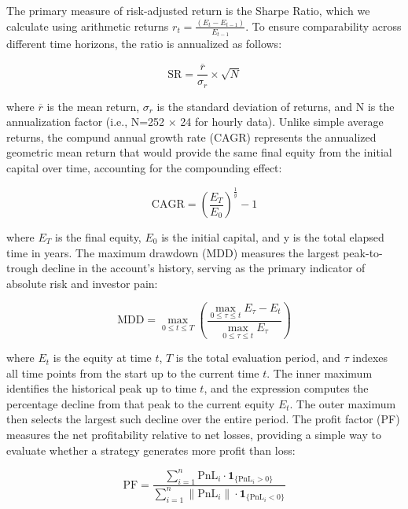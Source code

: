 \documentclass[12pt, a4paper]{article}
\begin{document}
The primary measure of risk-adjusted return is the Sharpe Ratio, which we calculate using arithmetic returns \( r_t = \frac{(E_t - E_{t-1})}{E_{t-1}} \). 
To ensure comparability across different time horizons, the ratio is annualized as follows:

\begin{equation}
    \text{SR} = \frac{\overline{r}}{\sigma_{r}} \times \sqrt{N}
    \label{eq:sharpe_ratio}
\end{equation}

where $\overline{r}$ is the mean return, $\sigma_{r}$ is the standard deviation of returns, and N is the annualization factor (i.e., N=252 $\times$ 24 for hourly data).
Unlike simple average returns, the compund annual growth rate (CAGR) represents the annualized geometric mean return that would provide the same final equity from the initial capital over time, 
accounting for the compounding effect:

\begin{equation}
    \text{CAGR} = \left( \frac{E_T}{E_0} \right)^{\frac{1}{y}} - 1
    \label{eq:cagr}
\end{equation}

where $E_T$ is the final equity, $E_0$ is the initial capital, and y is the total elapsed time in years.
The maximum drawdown (MDD) measures the largest peak-to-trough decline in the account's history, serving as the primary indicator of absolute risk and investor pain:

\begin{equation}
    \text{MDD} = \max_{0 \leq t \leq T} \left( \frac{ \max_{0 \leq \tau \leq t} E_\tau - E_t }{ \max_{0 \leq \tau \leq t} E_\tau } \right)
    \label{eq:mdd}
\end{equation}

where \(E_t\) is the equity at time \(t\), \(T\) is the total evaluation period, and \(\tau\) indexes all time points from the start up to the current time \(t\). 
The inner maximum identifies the historical peak up to time \(t\), and the expression computes the percentage decline from that peak to the current equity \(E_t\). 
The outer maximum then selects the largest such decline over the entire period.
The profit factor (PF) measures the net profitability relative to net losses, providing a simple way to evaluate whether a strategy generates more profit than loss:

\begin{equation}
    \text{PF} = \frac{\sum_{i=1}^{n} \text{PnL}_i \cdot \mathbf{1}_{\{\text{PnL}_i > 0\}}}{\sum_{i=1}^{n} \left\|\text{PnL}_i\right\| \cdot \mathbf{1}_{\{\text{PnL}_i < 0\}}}
    \label{eq:profit_factor}
\end{equation}
\end{document}
